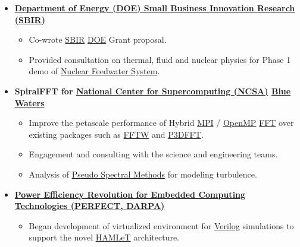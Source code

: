 \documentclass{article}
\begin{document}
\begin{itemize}
\begin{itemize}

  \end{itemize}

\item \textbf{\href{http://science.energy.gov/sbir/}{Department of Energy (DOE) Small Business Innovation Research (SBIR)}}

  \begin{itemize}
    \item Co-wrote \href{https://www.sbir.gov/about/about-sbir}{SBIR} \href{http://science.energy.gov/sbir/}{DOE} Grant proposal. 
    \item Provided consultation on thermal, fluid and nuclear physics for Phase 1 demo of \href{http://www.nucleartourist.com/systems/fw.htm}{Nuclear Feedwater System}.
  \end{itemize}

\item \textbf{SpiralFFT for \href{http://www.ncsa.illinois.edu}{National Center for Supercomputing  (NCSA)} \href{http://www.ncsa.illinois.edu/enabling/bluewaters}{Blue Waters}}

  \begin{itemize}
    \item Improve the petascale performance of Hybrid \href{http://en.wikipedia.org/wiki/Message_Passing_Interface}{MPI} / \href{http://en.wikipedia.org/wiki/OpenMP}{OpenMP} \href{https://en.wikipedia.org/wiki/Fast_Fourier_transform}{FFT} over existing packages such as \href{http://www.fftw.org/}{FFTW} and \href{https://code.google.com/p/p3dfft/}{P3DFFT}.   
    \item Engagement and consulting with the science and engineering teams.
    \item Analysis of \href{https://en.wikipedia.org/wiki/Pseudo-spectral_method}{Pseudo Spectral Methods} for modeling turbulence. 
  \end{itemize}
  
\item \textbf{\href{http://www.darpa.mil/Our_Work/MTO/Programs/Power_Efficiency_Revolution_for_Embedded_Computing_Technologies_(PERFECT).aspx}{Power Efficiency Revolution for Embedded Computing Technologies (PERFECT, \href{http://www.darpa.mil/default.aspx}{DARPA})}}

  \begin{itemize}
    \item Began development of virtualized environment for \href{https://en.wikipedia.org/wiki/Verilog}{Verilog} simulations to support the novel \href{http://www.contrib.andrew.cmu.edu/~bakin/publ.html}{HAMLeT} architecture.
  \end{itemize}


\end{itemize}
\end{document}
